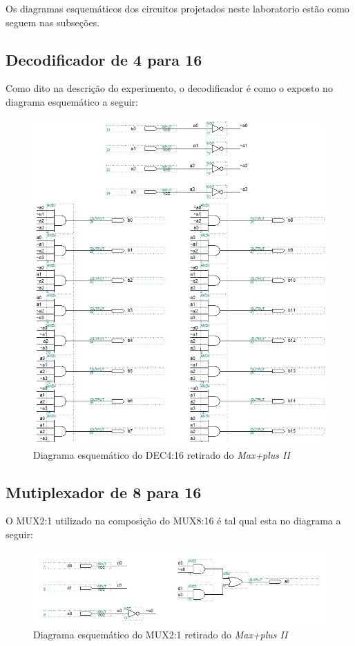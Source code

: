 \documentclass[a4paper]{article}
\begin{document}
	Os diagramas esquemáticos dos circuitos projetados neste laboratorio estão como seguem nas subseções.

\subsection{Decodificador de 4 para 16}

	Como dito na descrição do experimento, o decodificador é como o exposto no diagrama esquemático a seguir:
\begin{figure}[h!]
  \centering
  \includegraphics[scale=0.53]{decod_4-16(2).jpg}
  \caption{Diagrama esquemático do DEC4:16 retirado do \emph{Max+plus II}}
\end{figure}



\FloatBarrier

\subsection{Mutiplexador de 8 para 16}
	O MUX2:1 utilizado na composição do MUX8:16 é tal qual esta no diagrama a seguir:
\begin{figure}[h]
  \centering
  \includegraphics[scale=0.9]{mux_2-1.jpg}
  \caption{Diagrama esquemático do MUX2:1 retirado do \emph{Max+plus II}}
\end{figure}
\end{document}
